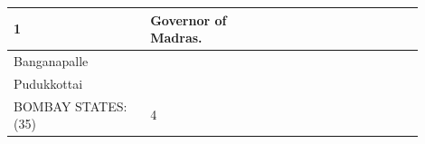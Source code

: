 \begin{longtable}{|p{0.30\linewidth}|p{0.30\linewidth}|p{0.30\linewidth}|}
{1

} & \multirow{3}{*}{

Governor of Madras.



} \\
\hline
Banganapalle

 \\
\hline
Pudukkottai

 \\
\hline
BOMBAY STATES: (35)

 & \multirow{37}{*}{































4









































} & \multirow{37}{*}{































}
\end{longtable}
